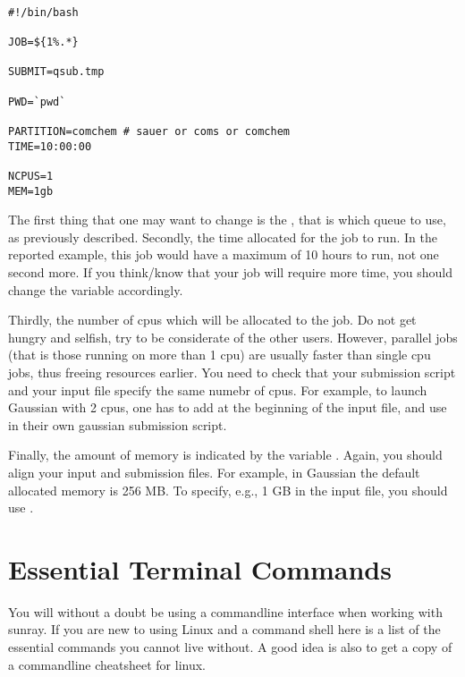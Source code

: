 \documentclass{article}
\begin{document}
\begin{verbatim}

#!/bin/bash

JOB=${1%.*}

SUBMIT=qsub.tmp

PWD=`pwd`

PARTITION=comchem # sauer or coms or comchem
TIME=10:00:00

NCPUS=1
MEM=1gb

\end{verbatim}

The first thing that one may want to change is the , that is which queue to use, as previously described.
Secondly, the time allocated for the job to run. In the reported example, this job would have a maximum of 10 hours to run, not one second more.
If you think/know that your job will require more time, you should change the variable  accordingly.

Thirdly, the number of cpus which will be allocated to the job. Do not get hungry and selfish, try to be considerate of the other users.
However, parallel jobs (that is those running on more than 1 cpu) are usually faster than single cpu jobs, thus freeing resources earlier. You need to
check that your submission script and your input file specify the same numebr of cpus. For example, to launch Gaussian with 2 cpus, one has to add
 at the beginning of the input file, and use  in their own gaussian submission script.

Finally, the amount of memory is indicated by the variable . Again, you should align your input and submission files.
For example, in Gaussian the default allocated memory is 256 MB. To specify, e.g., 1 GB in the input file, you should use .

\newpage


\section{Essential Terminal Commands}

You will without a doubt be using a commandline interface when working with sunray.
If you are new to using Linux and a command shell here is a list of the essential commands you cannot live without.
A good idea is also to get a copy of a commandline cheatsheet for linux.\\
\end{document}

